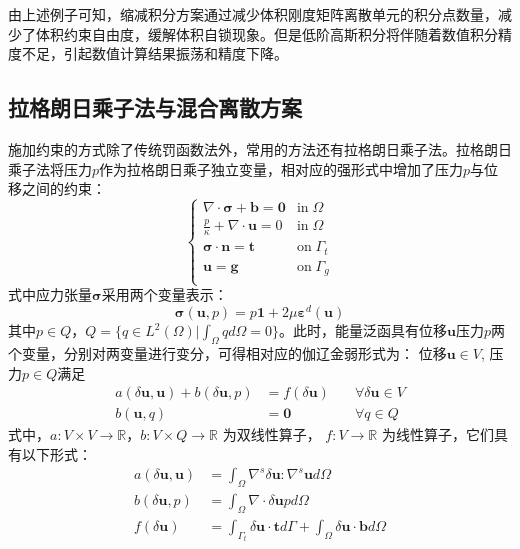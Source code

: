 由上述例子可知，缩减积分方案通过减少体积刚度矩阵离散单元的积分点数量，减少了体积约束自由度，缓解体积自锁现象。但是低阶高斯积分将伴随着数值积分精度不足，引起数值计算结果振荡和精度下降。
\subsection{拉格朗日乘子法与混合离散方案}
施加约束的方式除了传统罚函数法外，常用的方法还有拉格朗日乘子法。拉格朗日乘子法将压力$p$作为拉格朗日乘子独立变量，相对应的强形式中增加了压力$p$与位移之间的约束：
\begin{equation}\label{strong_mix}
    \begin{cases}
        \nabla \cdot \boldsymbol \sigma + \boldsymbol b = \boldsymbol 0 & \mathrm{in} \; \Omega \\
        \frac{p}{\kappa} + \nabla \cdot \boldsymbol u = 0 & \mathrm{in} \; \Omega \\
        \boldsymbol \sigma \cdot \boldsymbol n = \boldsymbol t & \mathrm{on} \; \Gamma_t \\
        \boldsymbol u = \boldsymbol g & \mathrm{on} \; \Gamma_g \\
    \end{cases}
\end{equation}
式中应力张量$\boldsymbol \sigma$采用两个变量表示：
\begin{equation}\label{stress_mix}
    \boldsymbol \sigma(\boldsymbol u, p) = p \boldsymbol 1 + 2\mu \boldsymbol \varepsilon^d(\boldsymbol u)
\end{equation}
其中$p\in Q$，$Q = \{q \in L^2(\Omega) \vert \int_{\Omega} q d\Omega = 0\}$。此时，能量泛函具有位移$\boldsymbol u$压力$p$两个变量，分别对两变量进行变分，可得相对应的伽辽金弱形式为：
位移$\boldsymbol u \in V$, 压力$p \in Q$满足
\begin{equation}\label{weak_mix}
    \begin{aligned}
        a(\delta \boldsymbol u, \boldsymbol u) + b(\delta \boldsymbol u, p) &= f(\delta \boldsymbol u) \quad &\forall \delta \boldsymbol u \in V \\
        b(\boldsymbol u, q) &= \boldsymbol 0 \quad &\forall q \in Q
    \end{aligned}
\end{equation}
式中，$a: V\times V\rightarrow \mathbb R$，$b: V\times Q\rightarrow \mathbb R$ 为双线性算子， $f: V \rightarrow \mathbb R$ 为线性算子，它们具有以下形式：
\begin{align}
    a(\delta \boldsymbol u, \boldsymbol u) &= \int_\Omega \nabla^s \delta \boldsymbol u: \nabla^s \boldsymbol u d\Omega \\
    b(\delta \boldsymbol u, p) &= \int_\Omega \nabla \cdot \delta \boldsymbol u p d\Omega \\
    f(\delta \boldsymbol u) &= \int_{\Gamma_t} \delta \boldsymbol u \cdot \boldsymbol t d\Gamma + \int_{\Omega} \delta \boldsymbol u \cdot \boldsymbol b d\Omega
\end{align}

